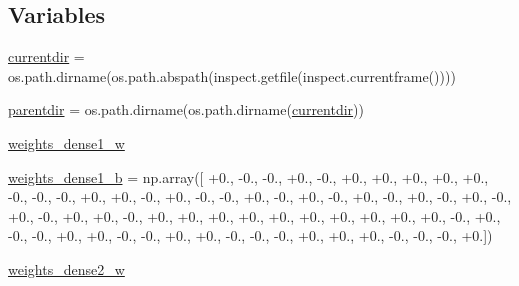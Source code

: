 \subsection*{Variables}
\begin{DoxyCompactItemize}
\item 
\hyperlink{namespacepybullet-gym_1_1pybulletgym_1_1examples_1_1roboschool-weights_1_1enjoy___t_f___inverted9d6b81a55deda3e52174841fe13ce955_a6af5eb3eda38f48c6f808d2778c50fab}{currentdir} = os.\+path.\+dirname(os.\+path.\+abspath(inspect.\+getfile(inspect.\+currentframe())))
\item 
\hyperlink{namespacepybullet-gym_1_1pybulletgym_1_1examples_1_1roboschool-weights_1_1enjoy___t_f___inverted9d6b81a55deda3e52174841fe13ce955_a45e793049d3efa253016a3a1cd660b39}{parentdir} = os.\+path.\+dirname(os.\+path.\+dirname(\hyperlink{namespacepybullet-gym_1_1pybulletgym_1_1examples_1_1roboschool-weights_1_1enjoy___t_f___inverted9d6b81a55deda3e52174841fe13ce955_a6af5eb3eda38f48c6f808d2778c50fab}{currentdir}))
\item 
\hyperlink{namespacepybullet-gym_1_1pybulletgym_1_1examples_1_1roboschool-weights_1_1enjoy___t_f___inverted9d6b81a55deda3e52174841fe13ce955_af5fe2825bbb15aa261f5709ceb83f697}{weights\+\_\+dense1\+\_\+w}
\item 
\hyperlink{namespacepybullet-gym_1_1pybulletgym_1_1examples_1_1roboschool-weights_1_1enjoy___t_f___inverted9d6b81a55deda3e52174841fe13ce955_a0e3e4283ab9e684d5089b6e64e8d3d89}{weights\+\_\+dense1\+\_\+b} = np.\+array(\mbox{[} +0., -\/0., -\/0., +0., -\/0., +0., +0., +0., +0., +0., -\/0., -\/0., -\/0., +0., +0., -\/0., +0., -\/0., -\/0., +0., -\/0., +0., -\/0., +0., -\/0., +0., -\/0., +0., -\/0., +0., -\/0., +0., +0., -\/0., +0., +0., +0., +0., +0., +0., +0., +0., +0., +0., -\/0., +0., -\/0., -\/0., +0., +0., -\/0., -\/0., +0., +0., -\/0., -\/0., -\/0., +0., +0., +0., -\/0., -\/0., -\/0., +0.\mbox{]})
\item 
\hyperlink{namespacepybullet-gym_1_1pybulletgym_1_1examples_1_1roboschool-weights_1_1enjoy___t_f___inverted9d6b81a55deda3e52174841fe13ce955_aa28f956e442f4c06c67b5ed44ab2f3b1}{weights\+\_\+dense2\+\_\+w}
\item 

\end{DoxyCompactItemize}
